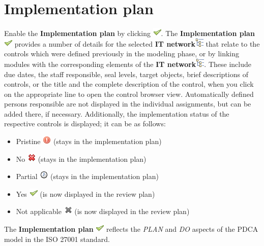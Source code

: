 \documentclass[a4paper,10pt]{book}
\begin{document}
\section{Implementation plan}
Enable the \textbf{Implementation plan} by clicking \includegraphics[height=2ex]{Icon/Okay.png}.
The \textbf{Implementation plan} \includegraphics[height=2ex]{Icon/Okay.png}
provides a number of details for the selected \textbf{IT network}\includegraphics[height=2ex]{Icon/GS_Modell.png}
that relate to the controls which were defined previously in the modeling phase, or by linking modules with
the corresponding elements of the \textbf{IT network}\includegraphics[height=2ex]{Icon/GS_Modell.png}.
These include due dates, the staff responsible, seal levels, target objects, brief descriptions of
controls, or the title and the complete description of the control, when you click on the appropriate
line to open the control browser view. Automatically defined persons responsible are not displayed
in the individual assignments, but can be added there, if necessary. Additionally, the implementation
status of the respective controls is displayed; it can be as follows:
\begin{itemize}
 \item Pristine \includegraphics[height=2ex]{Icon/Unbearbeitet.png} (stays in the implementation plan)
 \item No \includegraphics[height=2ex]{Icon/Nein.png} (stays in the implementation plan)
 \item Partial \includegraphics[height=2ex]{Icon/Teilweise.png} (stays in the implementation plan)
 \item Yes \includegraphics[height=2ex]{Icon/Okay.png} (is now displayed in the review plan)
 \item Not applicable \includegraphics[height=2ex]{Icon/Entbehrlich.png} (is now displayed in the review plan)
\end{itemize}
The \textbf{Implementation plan} \includegraphics[height=2ex]{Icon/Okay.png} reflects the {\em PLAN} and
{\em DO} aspects of the PDCA model in the ISO 27001 standard.
\end{document}
